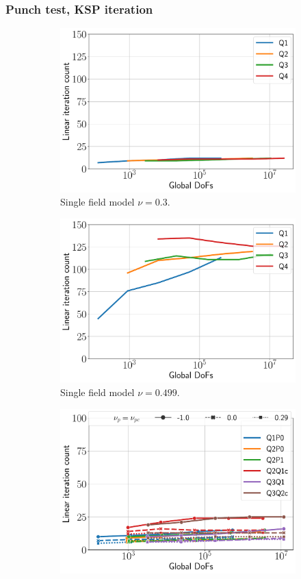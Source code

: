\documentclass{beamer}
\begin{document}
\begin{frame}
	\frametitle{Punch test, KSP iteration}
	\begin{figure}[H]
		\begin{subfigure}{.5\textwidth}
			\centering
			\includegraphics[width=.8\textwidth]{../figs/KSPiter-punch2-iso-0.3.pdf}
			\caption{Single field model $\nu = 0.3$.}
		\end{subfigure}%
		\begin{subfigure}{.5\textwidth}
			\centering
			\includegraphics[width=.8\textwidth]{../figs/KSPiter-punch2-iso-0.499.pdf}
			\caption{Single field model $\nu = 0.499$.}
		\end{subfigure}
		\begin{subfigure}{.5\textwidth}
			\centering
			\includegraphics[width=.8\textwidth]{../figs/KSPiter-punch2-mixed-0.3.pdf}

\end{subfigure}
\end{figure}
\end{frame}
\end{document}
